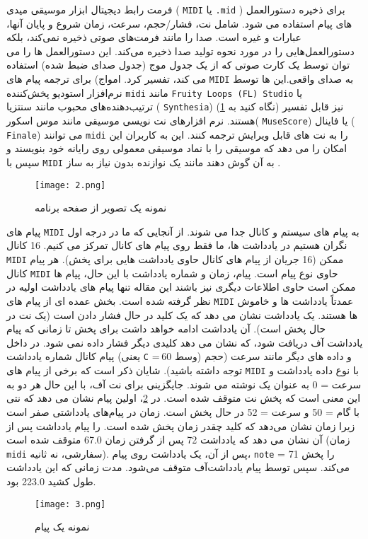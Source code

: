 فرمت رابط دیجیتال ابزار موسیقی میدی (
\verb;MIDI;
یا 
\verb;.mid;
) 
برای ذخیره دستورالعمل های پیام استفاده می شود.  شامل نت، فشار/حجم، سرعت، زمان شروع و پایان آنها، عبارات و غیره است. 
صدا را مانند فرمت‌های صوتی ذخیره نمی‌کند،  بلکه دستورالعمل‌هایی را در مورد نحوه تولید صدا ذخیره می‌کند. 
این دستورالعمل ها را می توان توسط یک کارت صوتی که از یک جدول موج (جدول صدای ضبط شده) استفاده می کند، تفسیر کرد.
امواج) برای ترجمه پیام های 
\verb;MIDI;
به صدای واقعی.این ها
توسط نرم‌افزار استودیو پخش‌کننده 
\verb;midi;
مانند 
\verb;Fruity Loops (FL) Studio;
یا ترتیب‌دهنده‌های محبوب مانند سنتزیا (
\verb;Synthesia;)
(نگاه کنید به
\cref{fig.2}) نیز قابل تفسیر هستند.  نرم افزارهای نت نویسی موسیقی مانند موس اسکور( 
\verb;MuseScore;)
یا فاینال ( 
\verb;Finale;)
می توانند 
\verb;midi; 
را به نت های قابل ویرایش ترجمه کنند. 
این به کاربران این امکان را می دهد که موسیقی را با نماد موسیقی معمولی روی رایانه خود بنویسند و سپس با 
\verb;MIDI; 
به آن گوش دهند
مانند یک نوازنده بدون نیاز به ساز .
\begin{figure}[!h]
\texttt{[image: 2.png]}
\caption{نمونه یک تصویر از صفحه برنامه 
}\label{fig.2}
\end{figure}
پیام های 
\verb;MIDI;
به پیام های سیستم و کانال جدا می شوند. از آنجایی که ما در درجه اول نگران هستیم
در یادداشت ها، ما فقط روی پیام های کانال تمرکز می کنیم. 16 کانال 
\verb;MIDI;
ممکن (16 جریان از
پیام های کانال حاوی یادداشت هایی برای پخش). هر پیام کانال 
\verb;MIDI;
حاوی نوع پیام است. 
پیام، زمان و شماره یادداشت با این حال، پیام ها ممکن است حاوی اطلاعات دیگری نیز باشند
این مقاله تنها پیام های یادداشت اولیه در نظر گرفته شده است.  بخش عمده ای از پیام های 
\verb;MIDI;
عمدتاً یادداشت ها و خاموش ها هستند.  یک یادداشت نشان می دهد که یک کلید در حال فشار دادن است (یک نت در حال پخش است).  آن یادداشت ادامه خواهد داشت
برای پخش تا زمانی که پیام یادداشت آف دریافت شود،  که نشان می دهد کلیدی دیگر فشار داده نمی شود.  در داخل
پیام کانال شماره یادداشت (یعنی 
\verb;C;
= 60
وسط) و داده های دیگر مانند سرعت (حجم
توجه داشته باشید). شایان ذکر است که برخی از پیام های 
\verb;MIDI;
با نوع داده یادداشت و سرعت = 0 به عنوان یک نوشته می شوند.
جایگزینی برای نت آف، با این حال هر دو به این معنی است که پخش نت متوقف شده است. 
در 
\cref{fig.3}، اولین پیام نشان می دهد که نتی با گام = 50 و سرعت = 52 در حال پخش است.
زمان در پیام‌های یادداشتی صفر است زیرا زمان نشان می‌دهد که کلید چقدر زمان پخش شده است. را
پیام یادداشت پس از آن نشان می دهد که یادداشت 72 پس از گرفتن زمان 67.0 متوقف شده است (زمان 
\verb;midi;
سفارشی، نه
ثانیه). پس از آن، یک یادداشت روی پیام، 
\verb;note;
= 71 
را پخش می‌کند.  سپس توسط پیام یادداشت‌آف متوقف می‌شود. 
مدت زمانی که این یادداشت طول کشید 223.0 بود. 
\begin{figure}[!h]
\texttt{[image: 3.png]}
\caption{نمونه یک پیام } \label{fig.3}
\end{figure}


